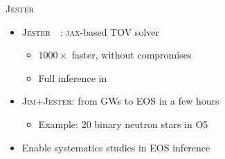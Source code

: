 \documentclass[usenames,dvipsnames,t]{beamer}
\newcommand{\ghlink}[1]{\href{https://github.com/#1}{\textcolor{black}{\faGithub}}}
\begin{document}
\begin{frame}{\textsc{Jester}}
  \def\x{2mm}

  \begin{itemize}
    \item \textsc{Jester}~\ghlink{nuclear-multimessenger-astronomy/jester}~\cite{Wouters:2025zju}: \textsc{jax}-based TOV solver
    \begin{itemize}
      \item $1000\times$ faster, without compromises
      \item Full inference in 
    \end{itemize}

    \vspace{\x}

    \item<2-> \textsc{Jim}$+$\textsc{Jester}: from GWs to EOS in a few hours
    \begin{itemize}
      \item Example: 20 binary neutron stars in O5
    \end{itemize}

    \vspace{\x}
    
    \item<2-> Enable systematics studies in EOS inference
  \end{itemize}

  \vspace{-3mm}

  \begin{columns}


\end{columns}
\end{frame}
\end{document}
